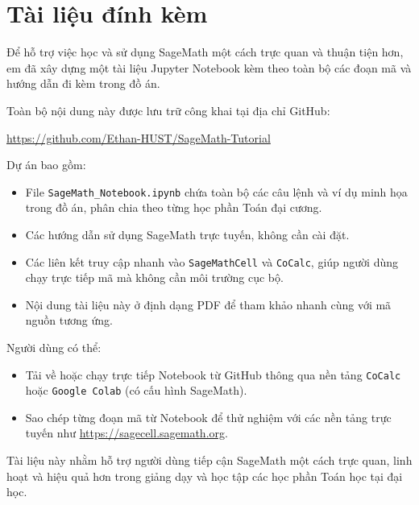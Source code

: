 \section{Tài liệu đính kèm}

Để hỗ trợ việc học và sử dụng SageMath một cách trực quan và thuận tiện hơn, em đã xây dựng một tài liệu Jupyter Notebook kèm theo toàn bộ các đoạn mã và hướng dẫn đi kèm trong đồ án.  

Toàn bộ nội dung này được lưu trữ công khai tại địa chỉ GitHub:

\begin{center}
	\url{https://github.com/Ethan-HUST/SageMath-Tutorial}
\end{center}

\noindent Dự án bao gồm:
\begin{itemize}
	\item File \texttt{SageMath\_Notebook.ipynb} chứa toàn bộ các câu lệnh và ví dụ minh họa trong đồ án, phân chia theo từng học phần Toán đại cương.
	\item Các hướng dẫn sử dụng SageMath trực tuyến, không cần cài đặt.
	\item Các liên kết truy cập nhanh vào \texttt{SageMathCell} và \texttt{CoCalc}, giúp người dùng chạy trực tiếp mã mà không cần môi trường cục bộ.
	\item Nội dung tài liệu này ở định dạng PDF để tham khảo nhanh cùng với mã nguồn tương ứng.
\end{itemize}

\noindent Người dùng có thể:
\begin{itemize}
	\item Tải về hoặc chạy trực tiếp Notebook từ GitHub thông qua nền tảng \texttt{CoCalc} hoặc \texttt{Google Colab} (có cấu hình SageMath).
	\item Sao chép từng đoạn mã từ Notebook để thử nghiệm với các nền tảng trực tuyến như \url{https://sagecell.sagemath.org}.
\end{itemize}

Tài liệu này nhằm hỗ trợ người dùng tiếp cận SageMath một cách trực quan, linh hoạt và hiệu quả hơn trong giảng dạy và học tập các học phần Toán học tại đại học.


